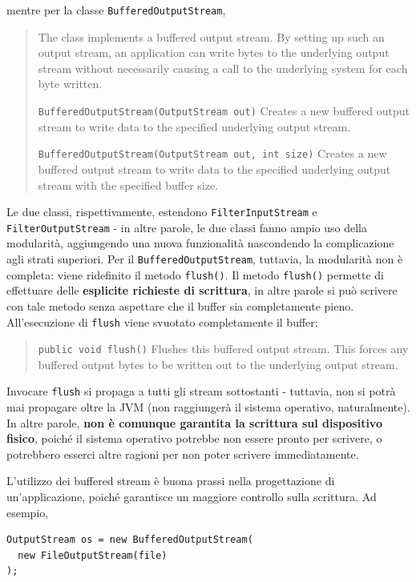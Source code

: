 \documentclass[\fontsizeclass,twocolumn]{\classname}
\theoremstyle{definition}
\theoremstyle{definition}
\begin{document}
mentre per la classe \texttt{BufferedOutputStream},


\begin{quote}
    \footnotesize{The class implements a buffered output stream. By setting up
    such an output stream, an application can write bytes to the underlying
output stream without necessarily causing a call to the underlying system for
each byte written.


\texttt{BufferedOutputStream(OutputStream out)} 	Creates a new buffered
output stream to write data to the specified underlying output stream.

\texttt{BufferedOutputStream(OutputStream out, int size)} 	Creates a new buffered
output stream to write data to the specified underlying output stream with the
specified buffer size.}
\end{quote}

Le due classi, rispettivamente, estendono \texttt{FilterInputStream} e
\texttt{FilterOutputStream} \-- in altre parole, le due classi fanno ampio uso
della modularità, aggiungendo una nuova funzionalità nascondendo la
complicazione agli strati superiori. Per il \texttt{BufferedOutputStream},
tuttavia, la modularità non è completa: viene ridefinito il metodo
\texttt{flush()}. Il metodo \texttt{flush()} permette di effettuare delle
\textbf{esplicite richieste di scrittura}, in altre parole si può scrivere con
tale metodo senza aspettare che il buffer sia completamente pieno.
All'esecuzione di \texttt{flush} viene svuotato completamente il buffer:


\begin{quote}
    \footnotesize{\texttt{public void flush()}
Flushes this buffered output stream. This forces any buffered output bytes to
be written out to the underlying output stream.}
\end{quote}

Invocare \texttt{flush} si propaga a tutti gli stream sottostanti \-- tuttavia,
non si potrà mai propagare oltre la JVM (non raggiungerà il sistema operativo,
naturalmente). In altre parole, \textbf{non è comunque garantita la scrittura
sul dispositivo fisico}, poiché il sistema operativo potrebbe non essere pronto
per scrivere, o potrebbero esserci altre ragioni per non poter scrivere
immediatamente.

L'utilizzo dei buffered stream è buona prassi nella progettazione di
un'applicazione, poiché garantisce un maggiore controllo sulla scrittura. Ad
esempio,

\begin{lstlisting}
OutputStream os = new BufferedOutputStream(
  new FileOutputStream(file)
);
\end{lstlisting}
\end{document}
